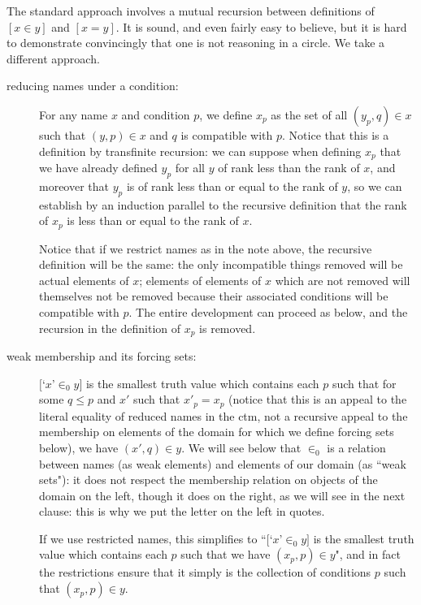 \documentclass[12pt]{book}
\begin{document}
The standard approach involves a mutual recursion between definitions of $[x \in y]$ and $[x=y]$.  It is sound, and even fairly easy to believe, but it is hard to demonstrate convincingly that one is not reasoning in a circle.  We take a different approach.

\begin{description}

\item[reducing names under a condition:]  For any name $x$ and condition $p$, we define $x_p$ as the set of all $(y_p,q) \in x$ such that $(y,p) \in x$ and $q$ is compatible with $p$.  Notice that this is a definition by transfinite recursion:  we can suppose when defining $x_p$ that we have already defined $y_p$ for all $y$ of rank less than the rank of $x$, and moreover that $y_p$ is of rank less than or equal to the rank of $y$, so we can establish by an induction parallel to the recursive definition that the rank of $x_p$ is less than or equal to the rank of $x$.

  Notice that if we restrict names as in the note above, the recursive definition will be the same:  the only incompatible things removed will be actual elements of $x$;  elements of elements of $x$ which are not removed will themselves not be removed because their associated conditions will be compatible with $p$.  The entire development can proceed as below, and the recursion in the definition of $x_p$ is removed.

\item[weak membership and its forcing sets:]  $[$`$x$'$ \in_0 y]$ is the smallest truth value which contains each $p$ such that for some $q \leq p$ and $x'$ such that $x'_p=x_p$ (notice that this is an appeal to the literal equality of reduced names in the ctm, not a recursive appeal to the membership on elements of the domain for which we define forcing sets below), we have $(x',q) \in y$.   We will see below that $\in_0$ is a relation between names (as weak elements) and elements of our domain (as ``weak sets"):  it does not respect the membership relation on objects of the domain on the left, though it does on the right, as we will see in the next clause:  this is why we put the letter on the left in quotes.

  If we use restricted names, this simplifies to ``$[$`$x$'$ \in_0 y]$ is the smallest truth value which contains each $p$ such that we have $(x_p,p) \in y$", and in fact the restrictions ensure that it simply is the collection of conditions $p$ such that $(x_p,p) \in y$.


\end{description}
\end{document}
